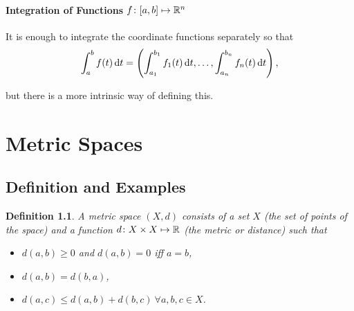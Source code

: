 \documentclass{notes}
\theoremstyle{plain}
\newtheorem{definition}[proposition]{Definition}
\begin{document}
\subsubsection{Integration of Functions $f\colon [a,b]\mapsto \mathbb{R}^{n}$}

It is enough to integrate the coordinate functions separately so that
\[
\int_{a}^{b}f(t)\,\mathrm{d} t = \left( \int_{a_{1}}^{b_{1}}f_{1}(t)\,\mathrm{d} t, \ldots,
\int_{a_{n}}^{b_{n}}f_{n}(t)\,\mathrm{d} t \right),
\]

but there is a more intrinsic way of defining this.



\chapter{Metric Spaces}

\section{Definition and Examples}

\begin{definition}
A \emph{metric space} $ (X,d) $ consists of a set $ X $ (the set 
of \emph{points} of the space) and a function $ d\colon X \times X 
\mapsto \mathbb{R} $ (the \emph{metric} or \emph{distance}) such that
\begin{itemize}
\item $d(a,b) \geq 0$ and $d(a,b)=0$ iff $a = b$,
\item $d(a,b)=d(b,a)$,
\item $d(a,c) \leq d(a,b)+d(b,c)\ \forall a,b,c \in X$.
\end{itemize}
\end{definition}
\end{document}
